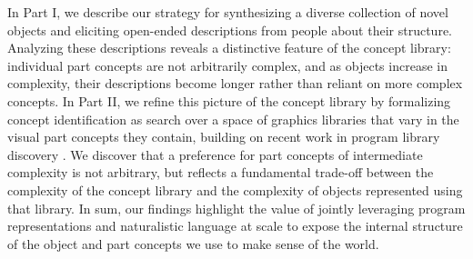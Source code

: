 \documentclass[10pt,letterpaper]{article}
\begin{document}
In Part I, we describe our strategy for synthesizing a diverse collection of novel objects and eliciting open-ended descriptions from people about their structure.
Analyzing these descriptions reveals a distinctive feature of the concept library: individual part concepts are not arbitrarily complex, and as objects increase in complexity, their descriptions become longer rather than reliant on more complex concepts.
In Part II, we refine this picture of the concept library by formalizing concept identification as search over a space of graphics libraries that vary in the visual part concepts they contain, building on recent work in program library discovery .
We discover that a preference for part concepts of intermediate complexity is not arbitrary, but reflects a fundamental trade-off between the complexity of the concept library and the complexity of objects represented using that library. 
In sum, our findings highlight the value of jointly leveraging program representations and naturalistic language at scale to expose the internal structure of the object and part concepts we use to make sense of the world. 


\end{document}
